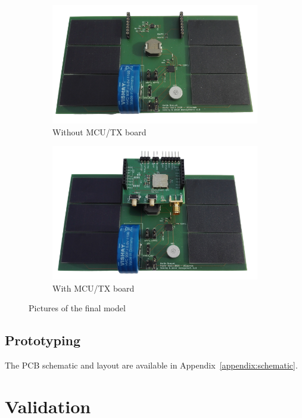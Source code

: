 \documentclass{EPL-master-thesis-covers-EN}
\begin{document}
\begin{figure}[H]
\begin{subfigure}{.5\textwidth}
  \centering
  \includegraphics[width=.9\linewidth]{real_PCB.png}  
  \caption{Without MCU/TX board}
\end{subfigure}
\begin{subfigure}{.48\textwidth}
  \centering
  \includegraphics[width=.9\linewidth]{real_PCB_with_MCU.png}  
  \caption{With MCU/TX board}
\end{subfigure}
\caption{Pictures of the final model}
\label{fig:final_model_picture}
\end{figure}

\subsection*{Prototyping}

The PCB schematic and layout are available in Appendix~\ref{appendix:schematic}.

\section{Validation}
\end{document}
